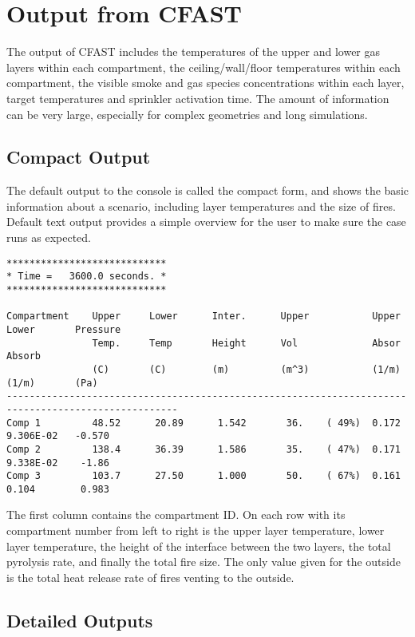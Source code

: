 \chapter{Output from CFAST}
\label{Output_Chapter}

The output of CFAST includes the temperatures of the upper and lower gas layers within each compartment, the ceiling/wall/floor temperatures within each compartment, the visible smoke and gas species concentrations within each layer, target temperatures and sprinkler activation time.  The amount of information can be very large, especially for complex geometries and long simulations.

\section{Compact Output}

The default output to the console is called the compact form, and shows the basic information about a scenario, including layer temperatures and the size of fires. Default text output provides a simple overview for the user to make sure the case runs as expected.
\begin{lstlisting}[basicstyle=\scriptsize]
****************************
* Time =   3600.0 seconds. *
****************************

Compartment    Upper     Lower      Inter.      Upper           Upper      Lower       Pressure
               Temp.     Temp       Height      Vol             Absor      Absorb
               (C)       (C)        (m)         (m^3)           (1/m)      (1/m)       (Pa)
----------------------------------------------------------------------------------------------------
Comp 1         48.52      20.89      1.542       36.    ( 49%)  0.172      9.306E-02   -0.570
Comp 2         138.4      36.39      1.586       35.    ( 47%)  0.171      9.338E-02    -1.86
Comp 3         103.7      27.50      1.000       50.    ( 67%)  0.161      0.104        0.983
\end{lstlisting}
The first column contains the compartment ID.  On each row with its compartment number from left to right is the upper layer temperature, lower layer temperature, the height of the interface between the two layers, the total pyrolysis rate, and finally the total fire size.  The only value given for the outside is the total heat release rate of fires venting to the outside.

\section{Detailed Outputs}

